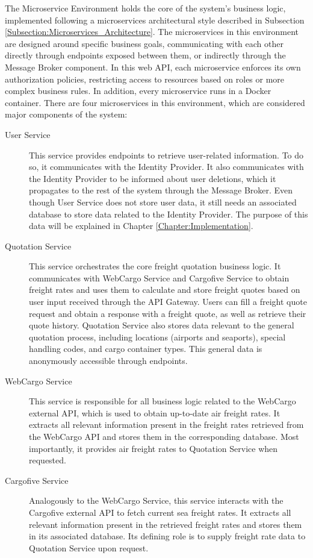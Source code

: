 \documentclass[12pt, reqno, oneside]{amsbook}
\theoremstyle{definition}
\theoremstyle{definition}
\numberwithin{section}{chapter}
\numberwithin{table}{chapter}
\numberwithin{figure}{chapter}
\begin{document}
The Microservice Environment holds the core of the system's business logic, implemented following a microservices architectural style described in Subsection \ref{Subsection:Microservices_Architecture}. The microservices in this environment are designed around specific business goals, communicating with each other directly through endpoints exposed between them, or indirectly through the Message Broker component. In this web \ac{API}, each microservice enforces its own authorization policies, restricting access to resources based on roles or more complex business rules. In addition, every microservice runs in a Docker container.
There are four microservices in this environment, which are considered major components of the system:
\begin{description}
  \item[User Service] This service provides endpoints to retrieve user-related information. To do so, it communicates with the Identity Provider. It also communicates with the Identity Provider to be informed about user deletions, which it propagates to the rest of the system through the Message Broker. Even though User Service does not store user data, it still needs an associated database to store data related to the Identity Provider. The purpose of this data will be explained in Chapter \ref{Chapter:Implementation}.
  \item[Quotation Service] This service orchestrates the core freight quotation business logic. It communicates with WebCargo Service and Cargofive Service to obtain freight rates and uses them to calculate and store freight quotes based on user input received through the \ac{API} Gateway. Users can fill a freight quote request and obtain a response with a freight quote, as well as retrieve their quote history. Quotation Service also stores data relevant to the general quotation process, including locations (airports and seaports), special handling codes, and cargo container types. This general data is anonymously accessible through endpoints.
  \item[WebCargo Service] This service is responsible for all business logic related to the WebCargo external \ac{API}, which is used to obtain up-to-date air freight rates. It extracts all relevant information present in the freight rates retrieved from the WebCargo \ac{API} and stores them in the corresponding database. Most importantly, it provides air freight rates to Quotation Service when requested.
  \item[Cargofive Service] Analogously to the WebCargo Service, this service interacts with the Cargofive external \ac{API} to fetch current sea freight rates. It extracts all relevant information present in the retrieved freight rates and stores them in its associated database. Its defining role is to supply freight rate data to Quotation Service upon request.
\end{description}
\end{document}
